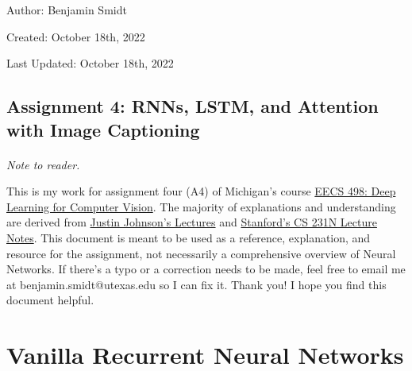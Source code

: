\documentclass[12pt]{article}
\begin{document}
\noindent Author: Benjamin Smidt

\noindent Created: October 18th, 2022

\noindent Last Updated: October 18th, 2022
\begin{center}
\section*{Assignment 4: RNNs, LSTM, and Attention with Image Captioning}
\end{center}

\paragraph{} \emph{Note to reader.} 

This is my work for assignment four (A4) of Michigan's course
\href{https://web.eecs.umich.edu/~justincj/teaching/eecs498/WI2022/}
{EECS 498: Deep Learning for Computer Vision}. The majority of explanations and understanding are 
derived from \href{https://www.youtube.com/watch?v=dJYGatp4SvA&list=PL5-TkQAfAZFbzxjBHtzdVCWE0Zbhomg7r&index=1}
{Justin Johnson's Lectures} and \href{http://cs231n.stanford.edu/schedule.html}{Stanford's CS 231N Lecture Notes}.
This document is meant to be used as a reference, 
explanation, and resource for the assignment, not necessarily a comprehensive overview
of Neural Networks. If there's a typo or a correction needs to be made, feel free to 
email me at benjamin.smidt@utexas.edu so I can fix it. Thank you! I hope you find this 
document helpful.

\tableofcontents{}

\newpage

\section{Vanilla Recurrent Neural Networks}
\end{document}
